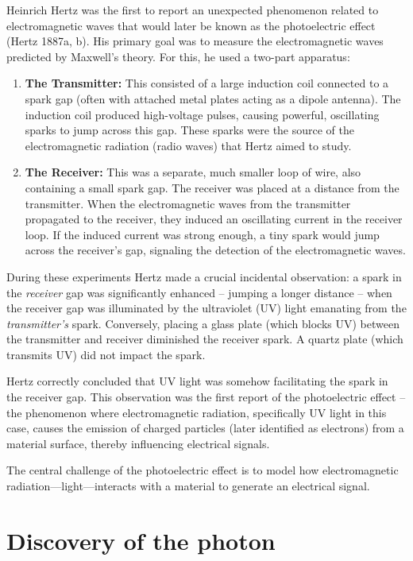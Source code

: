\documentclass[
  letterpaper,
]{book}
\begin{document}
Heinrich Hertz was the first to report an unexpected phenomenon related
to electromagnetic waves that would later be known as the photoelectric
effect (Hertz 1887a, b). His primary goal was to measure the
electromagnetic waves predicted by Maxwell's theory. For this, he used a
two-part apparatus:

\begin{enumerate}
\def\labelenumi{\arabic{enumi}.}
\item
  \textbf{The Transmitter:} This consisted of a large induction coil
  connected to a spark gap (often with attached metal plates acting as a
  dipole antenna). The induction coil produced high-voltage pulses,
  causing powerful, oscillating sparks to jump across this gap. These
  sparks were the source of the electromagnetic radiation (radio waves)
  that Hertz aimed to study.
\item
  \textbf{The Receiver:} This was a separate, much smaller loop of wire,
  also containing a small spark gap. The receiver was placed at a
  distance from the transmitter. When the electromagnetic waves from the
  transmitter propagated to the receiver, they induced an oscillating
  current in the receiver loop. If the induced current was strong
  enough, a tiny spark would jump across the receiver's gap, signaling
  the detection of the electromagnetic waves.
\end{enumerate}

During these experiments Hertz made a crucial incidental observation: a
spark in the \emph{receiver} gap was significantly enhanced -- jumping a
longer distance -- when the receiver gap was illuminated by the
ultraviolet (UV) light emanating from the \emph{transmitter's} spark.
Conversely, placing a glass plate (which blocks UV) between the
transmitter and receiver diminished the receiver spark. A quartz plate
(which transmits UV) did not impact the spark.

Hertz correctly concluded that UV light was somehow facilitating the
spark in the receiver gap. This observation was the first report of the
photoelectric effect -- the phenomenon where electromagnetic radiation,
specifically UV light in this case, causes the emission of charged
particles (later identified as electrons) from a material surface,
thereby influencing electrical signals.

The central challenge of the photoelectric effect is to model how
electromagnetic radiation---light---interacts with a material to
generate an electrical signal.

\section{Discovery of the photon}\label{sec-photon-discovered}
\end{document}
